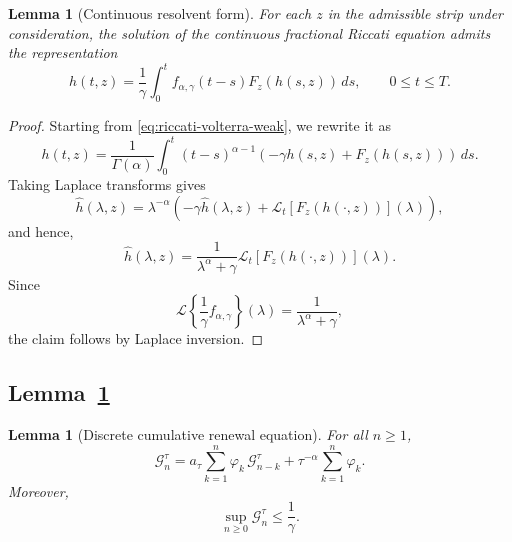 \documentclass[letterpaper]{article}
\numberwithin{equation}{section}
\newtheorem{lemma}[theorem]{Lemma}
\theoremstyle{definition}
\theoremstyle{remark}
\begin{document}


\begin{lemma}[Continuous resolvent form]
\label{lem:continuous-resolvent}
For each $z$ in the admissible strip under consideration, the solution of the
continuous fractional Riccati equation admits the representation
\begin{equation}\label{eq:continuous-resolvent}
  h(t,z)
  =
  \frac1\gamma\int_0^t f_{\alpha,\gamma}(t-s)F_z(h(s,z))\,ds,
  \qquad 0\le t\le T.
\end{equation}
\end{lemma}

\begin{proof}
Starting from \eqref{eq:riccati-volterra-weak}, we rewrite it as
\[
  h(t,z)
  =
  \frac1{\Gamma(\alpha)}\int_0^t (t-s)^{\alpha-1}
  \left(-\gamma h(s,z)+F_z(h(s,z))\right)\,ds.
\]
Taking Laplace transforms gives
\[
  \widehat h(\lambda,z)
  =
  \lambda^{-\alpha}
  \left(
    -\gamma \widehat h(\lambda,z)
    +\mathcal L_t[F_z(h(\cdot,z))](\lambda)
  \right),
\]
and hence,
\[
  \widehat h(\lambda,z)
  =
  \frac{1}{\lambda^\alpha+\gamma}
  \mathcal L_t[F_z(h(\cdot,z))](\lambda).
\]
Since
\[
  \mathcal L\!\left\{\frac1\gamma f_{\alpha,\gamma}\right\}(\lambda)
  =
  \frac{1}{\lambda^\alpha+\gamma},
\]
the claim follows by Laplace inversion.
\end{proof}


\subsection{Lemma~\ref{lem:cum-resolvent-renewal}}\label{app:proof-cum-resolvent-renewal}

\begin{lemma}[Discrete cumulative renewal equation]
\label{lem:cum-resolvent-renewal}
For all $n\ge1$,
\begin{equation}\label{eq:cum-resolvent-renewal}
  \mathcal G_n^\tau
  =
  a_\tau\sum_{k=1}^n\varphi_k\,\mathcal G_{n-k}^\tau
  +\tau^{-\alpha}\sum_{k=1}^n\varphi_k.
\end{equation}
Moreover,
\begin{equation}\label{eq:cum-resolvent-uniform}
  \sup_{n\ge0}\mathcal G_n^\tau\le\frac1\gamma.
\end{equation}
\end{lemma}
\end{document}
